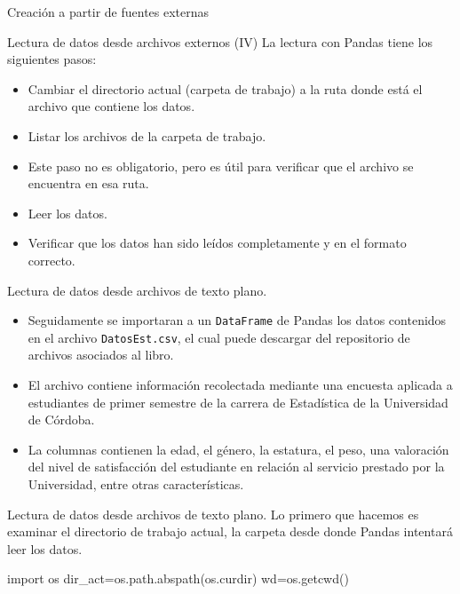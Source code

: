 \documentclass[
  ignorenonframetext,
  aspectratio=169,
  spanish,
]{beamer}
\newenvironment{Shaded}{\begin{snugshade}}{\end{snugshade}}
\newcommand{\ImportTok}[1]{\textcolor[rgb]{0.00,0.46,0.62}{#1}}
\newcommand{\NormalTok}[1]{\textcolor[rgb]{0.00,0.23,0.31}{#1}}
\newcommand{\OperatorTok}[1]{\textcolor[rgb]{0.37,0.37,0.37}{#1}}
\newcommand*\circled[1]{\tikz[baseline=(char.base)]{
          \node[shape=circle,draw,inner sep=1pt] (char) {{\scriptsize#1}};}}
\begin{document}
\begin{frame}[fragile]{Creación a partir de fuentes externas}
\begin{block}{Lectura de datos desde archivos externos (IV)}
\label{lectura-de-datos-desde-archivos-externos-iv}
La lectura con Pandas tiene los siguientes pasos:

\begin{itemize}
\item
  Cambiar el directorio actual (carpeta de trabajo) a la ruta donde está
  el archivo que contiene los datos.
\item
  Listar los archivos de la carpeta de trabajo.
\item
  Este paso no es obligatorio, pero es útil para verificar que el
  archivo se encuentra en esa ruta.
\item
  Leer los datos.
\item
  Verificar que los datos han sido leídos completamente y en el formato
  correcto.
\end{itemize}
\end{block}

\begin{block}{Lectura de datos desde archivos de texto plano.}
\label{lectura-de-datos-desde-archivos-de-texto-plano.}
\begin{itemize}
\item
  Seguidamente se importaran a un \texttt{DataFrame} de Pandas los datos
  contenidos en el archivo \texttt{DatosEst.csv}, el cual puede
  descargar del repositorio de archivos asociados al libro.
\item
  El archivo contiene información recolectada mediante una encuesta
  aplicada a estudiantes de primer semestre de la carrera de Estadística
  de la Universidad de Córdoba.
\item
  La columnas contienen la edad, el género, la estatura, el peso, una
  valoración del nivel de satisfacción del estudiante en relación al
  servicio prestado por la Universidad, entre otras características.
\end{itemize}
\end{block}

\begin{block}{Lectura de datos desde archivos de texto plano.}
\label{lectura-de-datos-desde-archivos-de-texto-plano.-1}
Lo primero que hacemos es examinar el directorio de trabajo actual, la
carpeta desde donde Pandas intentará leer los datos.

\label{annotated-cell-15}%
\begin{Shaded}
\begin{Highlighting}[]
\ImportTok{import}\NormalTok{ os }\hspace*{\fill}\NormalTok{\circled{1}}
\NormalTok{dir\_act}\OperatorTok{=}\NormalTok{os.path.abspath(os.curdir) }\hspace*{\fill}\NormalTok{\circled{2}}
\NormalTok{wd}\OperatorTok{=}\NormalTok{os.getcwd() }\hspace*{\fill}\NormalTok{\circled{3}}
\end{Highlighting}
\end{Shaded}


\end{block}
\end{frame}
\end{document}
